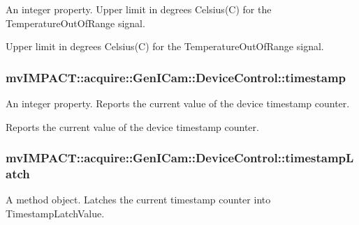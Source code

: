 An integer property. Upper limit in degrees Celsius(\+C) for the Temperature\+Out\+Of\+Range signal. 

Upper limit in degrees Celsius(\+C) for the Temperature\+Out\+Of\+Range signal. \hypertarget{classmv_i_m_p_a_c_t_1_1acquire_1_1_gen_i_cam_1_1_device_control_aac2c5f9af3720bdd277c34ccda97e7a6}{
\subsubsection[{timestamp}]{ mv\+I\+M\+P\+A\+C\+T\+::acquire\+::\+Gen\+I\+Cam\+::\+Device\+Control\+::timestamp}}\label{classmv_i_m_p_a_c_t_1_1acquire_1_1_gen_i_cam_1_1_device_control_aac2c5f9af3720bdd277c34ccda97e7a6}


An integer property. Reports the current value of the device timestamp counter. 

Reports the current value of the device timestamp counter. \hypertarget{classmv_i_m_p_a_c_t_1_1acquire_1_1_gen_i_cam_1_1_device_control_a9f7d5ffaf2717052f55c6eb3ddaa8e35}{
\subsubsection[{timestamp\+Latch}]{ mv\+I\+M\+P\+A\+C\+T\+::acquire\+::\+Gen\+I\+Cam\+::\+Device\+Control\+::timestamp\+Latch}}\label{classmv_i_m_p_a_c_t_1_1acquire_1_1_gen_i_cam_1_1_device_control_a9f7d5ffaf2717052f55c6eb3ddaa8e35}


A method object. Latches the current timestamp counter into Timestamp\+Latch\+Value. 

